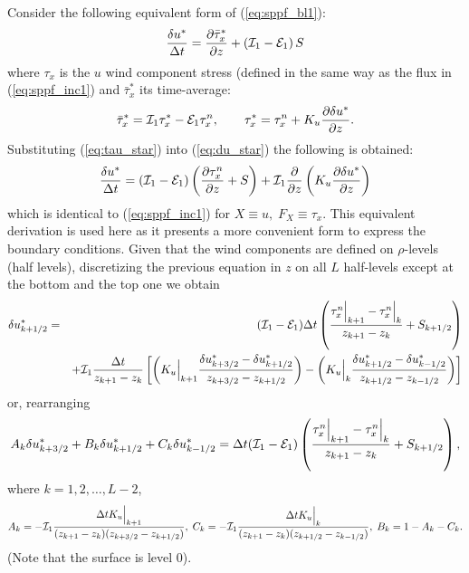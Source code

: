 \documentclass{UMDP_article}
\begin{document}
\noindent
Consider the following equivalent form of (\ref{eq:sppf_bl1}):
\begin{equation}
  \frac{\delta u^{*}}{\Delta t}=\frac{\partial\bar{\tau}_{x}^{*}}{\partial z}+\left({\cal I}_{1}-{\cal E}_{1}\right)S\label{eq:du_star}
\end{equation}
where $\tau_{x}$ is the $u$ wind component stress (defined in the same
way as the flux in (\ref{eq:sppf_inc1}) and $\bar{\tau}_{x}^{*}$ its
time-average:
\begin{equation}
  \bar{\tau}_{x}^{*}={\cal I}_{1}\tau_{x}^{*}-{\cal E}_{1}\tau_{x}^{n},\qquad\tau_{x}^{*}=\tau_{x}^{n}+K_{u}\frac{\partial\delta
    u^{*}}{\partial z}.\label{eq:tau_star}
\end{equation} 
Substituting (\ref{eq:tau_star}) into (\ref{eq:du_star}) the following
is obtained:
\begin{equation*}
  \frac{\delta u^{*}}{\Delta
    t}=({\cal I}_{1}-{\cal E}_{1})\left(\frac{\partial\tau_{x}^{n}}{\partial
      z}+S\right)+{\cal I}_{1}\frac{\partial}{\partial
    z}\left(K_{u}\frac{\partial\delta u^{*}}{\partial z}\right)
\end{equation*}
which is identical to (\ref{eq:sppf_inc1}) for $X\equiv u,\;
F_{X}\equiv\tau_{x}$.  This equivalent derivation is used here as it
presents a more convenient form to express the boundary
conditions. Given that the wind components are defined on
$\rho$-levels (half levels), discretizing the previous equation in $z$
on all $L$ half-levels except at the bottom and the top one we obtain
\begin{eqnarray*}
  \delta u_{k+1/2}^{*} & = & ({\cal I}_{1}-{\cal E}_{1})\Delta t\left(\frac{\tau_{x}^{n}\Big|_{k+1}-\tau_{x}^{n}\Big|_{k}}{z_{k+1}-z_{k}}+S_{k+1/2}\right)\\
  & & +{\cal I}_{1}\frac{\Delta
    t}{z_{k+1}-z_{k}}\left[\left(K_{u}\Big|_{k+1}\frac{\delta
        u_{k+3/2}^{*}-\delta
        u_{k+1/2}^{*}}{z_{k+3/2}-z_{k+1/2}}\right)-\left(K_{u}\Big|_{k}\frac{\delta
        u_{k+1/2}^{*}-\delta
        u_{k-1/2}^{*}}{z_{k+1/2}-z_{k-1/2}}\right)\right]
\end{eqnarray*}
or, rearranging
\begin{equation} 
  A_{k}\delta u_{k+3/2}^{*}+B_{k}\delta
  u_{k+1/2}^{*}+C_{k}\delta u_{k-1/2}^{*}=\Delta
  t({\cal I}_{1}-{\cal E}_{1})\left(\frac{\tau_{x}^{n}\Big|_{k+1}-\tau_{x}^{n}\Big|_{k}}{z_{k+1}-z_{k}}+S_{k+1/2}\right),\label{eq:tridiag}
\end{equation}
where $k=1,2,\ldots,L-2$,
\begin{equation*}
  A_{k}=-\Ical_{1}\frac{\Delta t\noindent
    K_{u}\Big|_{k+1}}{(z_{k+1}-z_{k})(z_{k+3/2}-z_{k+1/2})},\;
  C_{k}=-\Ical_{1}\frac{\Delta
    tK_{u}\Big|_{k}}{(z_{k+1}-z_{k})(z_{k+1/2}-z_{k-1/2})},\;
  B_{k}=1-A_{k}-C_{k}.
\end{equation*}
(Note that the surface is level $0$).
\end{document}
